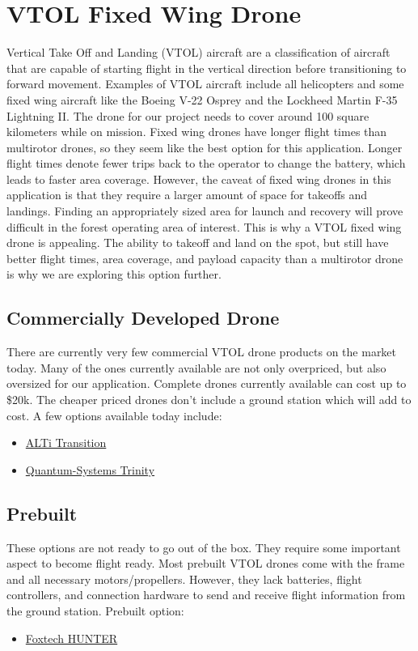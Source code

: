 \documentclass[onecolumn, 10pt, compsoc]{IEEEtran}
\begin{document}
\section{VTOL Fixed Wing Drone}
Vertical Take Off and Landing (VTOL) aircraft are a classification of aircraft that are capable of starting flight in the vertical direction before transitioning to forward movement. Examples of VTOL aircraft include all helicopters and some fixed wing aircraft like the Boeing V-22 Osprey and the Lockheed Martin F-35 Lightning II. The drone for our project needs to cover around 100 square kilometers while on mission. Fixed wing drones have longer flight times than multirotor drones\cite{DroneTypes}, so they seem like the best option for this application. Longer flight times denote fewer trips back to the operator to change the battery, which leads to faster area coverage. However, the caveat of fixed wing drones in this application is that they require a larger amount of space for takeoffs and landings. Finding an appropriately sized area for launch and recovery will prove difficult in the forest operating area of interest. This is why a VTOL fixed wing drone is appealing. The ability to takeoff and land on the spot, but still have better flight times, area coverage, and payload capacity than a multirotor drone \cite{DroneTypes} is why we are exploring this option further.
\subsection{Commercially Developed Drone}
There are currently very few commercial VTOL drone products on the market today. Many of the ones currently available are not only overpriced, but also oversized for our application. Complete drones currently available can cost up to \$20k. The cheaper priced drones don’t include a ground station which will add to cost. A few options available today include:
\begin{itemize}
    \item \href{http://www.altiuas.com/transition/}{ALTi Transition}
    \item \href{https://www.quantum-systems.com/trinity/}{Quantum-Systems Trinity}
\end{itemize}
\subsection{Prebuilt}
These options are not ready to go out of the box. They require some important aspect to become flight ready. Most prebuilt VTOL drones come with the frame and all necessary motors/propellers. However, they lack batteries, flight controllers, and connection hardware to send and receive flight information from the ground station. Prebuilt option: 
\begin{itemize}
    \item \href{https://www.foxtechfpv.com/foxtech-hunter-290-vtol-aircraft.html}{Foxtech HUNTER}
\end{itemize}
\end{document}
